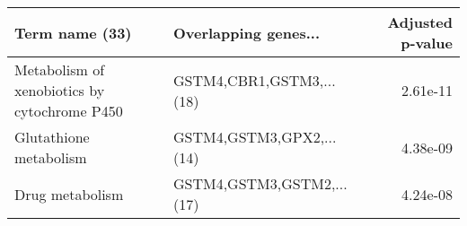 \begin{tabular}{llr}
\toprule
                              Term name (33) &      Overlapping genes... &  Adjusted p-value \\
\midrule
Metabolism of xenobiotics by cytochrome P450 &  GSTM4,CBR1,GSTM3,...(18) &          2.61e-11 \\
                      Glutathione metabolism &  GSTM4,GSTM3,GPX2,...(14) &          4.38e-09 \\
                             Drug metabolism & GSTM4,GSTM3,GSTM2,...(17) &          4.24e-08 \\
\bottomrule
\end{tabular}

